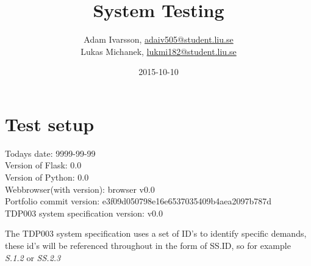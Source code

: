 \documentclass{TDP003mall}
\author{Adam Ivarsson, \url{adaiv505@student.liu.se}\\
  Lukas Michanek, \url{lukmi182@student.liu.se}}
\title{System Testing}
\date{2015-10-10}
\begin{document}
\projectpage

\section{Test setup}\label{general-overview}

Todays date: 9999-99-99\\
Version of Flask: 0.0\\
Version of Python: 0.0\\
Webbrowser(with version): browser v0.0\\
Portfolio commit version: e3f09d050798e16e6537035409b4aea2097b787d\\
TDP003 system specification version: v0.0


The TDP003 system specification uses a set of ID's to identify specific demands, these id's will be referenced throughout in the form of SS.ID, so for example \textit{S.1.2} or \textit{SS.2.3}

\end{document}
